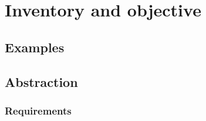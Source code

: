 \chapter{Inventory and objective}
\label{chapter:bestandsaufnahme}
\section{Examples}
\section{Abstraction}
\subsection{Requirements}